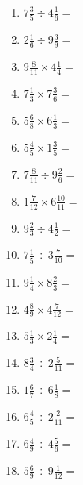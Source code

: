 \documentclass[12pt]{article}
\begin{document}
\begin{enumerate}
\item \large $ 7 \frac{3}{5} \div 4 \frac{1}{6} = $ \vspace{1.6cm}
\item \large $ 2 \frac{1}{6} \div 9 \frac{3}{9} = $ \vspace{1.6cm}
\item \large $ 9 \frac{8}{11} \times 4 \frac{1}{4} = $ \vspace{1.6cm}
\item \large $ 7 \frac{1}{3} \times 7 \frac{3}{6} = $ \vspace{1.6cm}
\newpage
\item \large $ 5 \frac{6}{8} \times 6 \frac{1}{3} = $ \vspace{1.6cm}
\item \large $ 5 \frac{4}{5} \times 1 \frac{3}{5} = $ \vspace{1.6cm}
\item \large $ 7 \frac{8}{11} \div 9 \frac{2}{6} = $ \vspace{1.6cm}
\item \large $ 1 \frac{7}{12} \times 6 \frac{10}{11} = $ \vspace{1.6cm}
\item \large $ 9 \frac{2}{3} \div 4 \frac{1}{2} = $ \vspace{1.6cm}
\item \large $ 7 \frac{1}{5} \div 3 \frac{7}{10} = $ \vspace{1.6cm}
\item \large $ 9 \frac{1}{4} \times 8 \frac{2}{3} = $ \vspace{1.6cm}
\item \large $ 4 \frac{8}{9} \times 4 \frac{7}{12} = $ \vspace{1.6cm}
\item \large $ 5 \frac{1}{3} \times 2 \frac{1}{4} = $ \vspace{1.6cm}
\item \large $ 8 \frac{3}{4} \div 2 \frac{5}{11} = $ \vspace{1.6cm}
\newpage
\item \large $ 1 \frac{6}{7} \div 6 \frac{1}{8} = $ \vspace{1.6cm}
\item \large $ 6 \frac{4}{5} \div 2 \frac{2}{11} = $ \vspace{1.6cm}
\item \large $ 6 \frac{4}{9} \div 4 \frac{5}{6} = $ \vspace{1.6cm}
\item \large $ 5 \frac{6}{9} \div 9 \frac{1}{12} = $ \vspace{1.6cm}

\end{enumerate}
\end{document}
